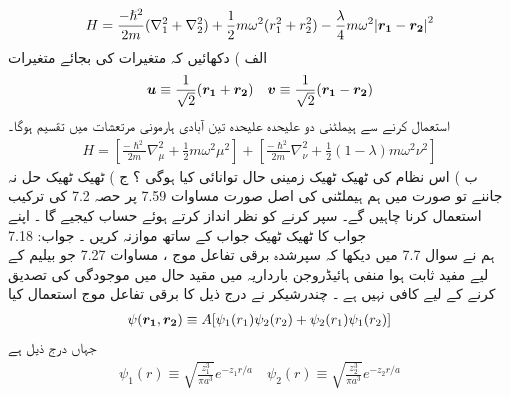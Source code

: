 \begin{align}
H=\frac{-\hslash^{2}}{2m}(\nabla_{1}^{2}+\nabla_{2}^{2})+\frac{1}{2}m\omega^{2}(r_{1}^{2}+r_{2}^{2})-\frac{\lambda}{4}m\omega^{2}\abs{{{\boldsymbol{r_{1}}}}-{{\boldsymbol{r_{2}}}}}^{2} 
\end{align}
 الف ) دکھائیں کہ متغیرات  کی بجائے متغیرات
\begin{align}
{\ensuremath{{\boldsymbol{u}}}}\equiv\frac{1}{\sqrt{2}}({{\boldsymbol{r_{1}}}}+{{\boldsymbol{r_{2}}}})\quad {\ensuremath{{\boldsymbol{v}}}}\equiv\frac{1}{\sqrt{2}}({{\boldsymbol{r_{1}}}}-{{\boldsymbol{r_{2}}}})
\end{align}
 استعمال کرنے سے ہیملٹنی دو علیحدہ علیحدہ تین آبادی ہارمونی  مرتعشات میں تقسیم ہوگا۔
\begin{align}
H=[\frac{-\hslash^{2}}{2m}\nabla_{\mu}^{2}+\frac{1}{2}m\omega^{2}\mu^{2}]+[\frac{-\hslash^{2}}{2m}\nabla_{\nu}^{2}+\frac{1}{2}(1-\lambda)m\omega^{2}\nu^{2}]
\end{align}
 ب ) اس نظام کی ٹھیک ٹھیک زمینی حال توانائی کیا ہوگی ؟
ج ) ٹھیک ٹھیک حل نہ جاننے تو صورت میں ہم ہیملٹنی کی اصل صورت مساوات 7.59 پر حصہ 7.2 کی ترکیب استعمال کرنا چاہیں گے۔
سپر کرنے کو نظر انداز کرتے ہوئے حساب کیجیے گا ۔ اپنے جواب کا ٹھیک ٹھیک جواب کے ساتھ موازنہ کریں ۔
جواب: 
7.18\\
ہم نے سوال 7.7 میں دیکھا کہ سپرشدہ برقی تفاعل موج ، مساوات 7.27 جو بیلیم کے لیے مفید ثابت ہوا منفی ہائیڈروجن بارداریہ میں مقید حال میں موجودگی کی تصدیق کرنے کے لیے کافی نہیں ہے ۔ چندرشیكر  نے درج ذیل کا برقی تفاعل موج استعمال کیا
\begin{align}
\psi({{\boldsymbol{r_{1}}}},{{\boldsymbol{r_{2}}}})\equiv A[\psi_{1}(r_{1})\psi_{2}(r_{2})+\psi_{2}(r_{1})\psi_{1}(r_{2})]
\end{align}
 جہاں درج ذیل ہے
\begin{align}
\psi_{1}(r)\equiv \sqrt{\frac{z_{1}^{3}}{\pi a^{3}}}e^{-z_{1}r/a} \quad \psi_{2}(r)\equiv \sqrt{\frac{z_{2}^{3}}{\pi a^{3}}}e^{-z_{2}r/a} 
\end{align}
 
